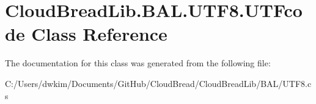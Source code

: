 \hypertarget{a00190}{}\section{Cloud\+Bread\+Lib.\+B\+A\+L.\+U\+T\+F8.\+U\+T\+Fcode Class Reference}
\label{a00190}


The documentation for this class was generated from the following file\+:\begin{DoxyCompactItemize}
\item 
C\+:/\+Users/dwkim/\+Documents/\+Git\+Hub/\+Cloud\+Bread/\+Cloud\+Bread\+Lib/\+B\+A\+L/U\+T\+F8.\+cs\end{DoxyCompactItemize}
